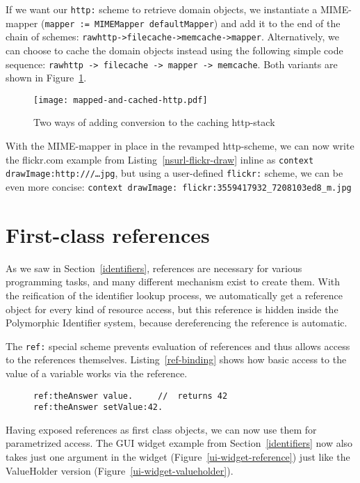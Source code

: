 \documentclass[preprint]{sigplanconf}
\begin{document}
If we want our {\tt http:} scheme to retrieve domain objects, we instantiate a MIME-mapper
({\tt mapper := MIMEMapper defaultMapper}) and add it to the end of the chain of schemes: 
{\tt rawhttp->filecache->memcache->mapper}.  Alternatively, we can choose to cache the
domain objects instead using the following simple code sequence: {\tt rawhttp -> filecache -> mapper -> memcache}.
Both variants are shown in Figure~\ref{http-cached-converted}.


\begin{figure}[htbp]
\centering
\texttt{[image: mapped-and-cached-http.pdf]}
\caption{Two ways of adding conversion to the caching http-stack}
\label{http-cached-converted}
\end{figure}


With the MIME-mapper in place in the revamped http-scheme, we can now 
write the flickr.com example from Listing~\ref{nsurl-flickr-draw} inline as {\tt context drawImage:http:///{\ldots}jpg},
but using a user-defined {\tt flickr:} scheme, we can be even more concise:  
{\tt context drawImage: flickr:3559417932\_7208103ed8\_m.jpg}


\section{First-class references}
\label{references}

As we saw in Section~\ref{identifiers}, references are necessary for various programming tasks,
and many different mechanism exist to create them.   With the reification of the identifier lookup
process, we automatically get a reference object for every kind of resource access, but this
reference is hidden inside the Polymorphic Identifier system, because dereferencing the
reference is automatic.

The {\tt ref:} special scheme prevents evaluation of references and thus allows access
to the references themselves.  Listing~\ref{ref-binding} shows how basic access to
the value of a variable works via the reference.


\begin{figure}[htbp]
\begin{lstlisting}[style=numbers,label=ref-binding,caption=Retrieve and store value via its reference.]
ref:theAnswer value.     //  returns 42
ref:theAnswer setValue:42.  
\end{lstlisting}
\end{figure}

Having exposed references as first class objects, we can now use them for parametrized 
access.  The GUI widget example from Section~\ref{identifiers} now
also takes just one argument in the widget (Figure~\ref{ui-widget-reference}) just like
the ValueHolder version (Figure~\ref{ui-widget-valueholder}).
\end{document}

